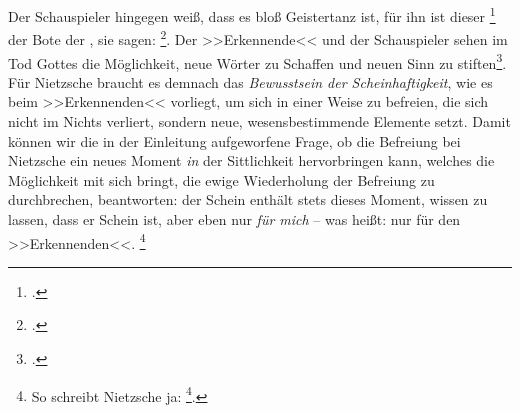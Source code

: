 \documentclass[12pt, a4paper, openany]{report}
\begin{document}
Der Schauspieler hingegen weiß, dass es bloß Geistertanz ist, für ihn ist dieser \footcite[][481]{nietzsche_morgenrote_1999} der Bote der , sie sagen: \footcite[][574]{nietzsche_morgenrote_1999}.
Der >>Erkennende<< und der Schauspieler sehen im Tod Gottes die Möglichkeit, neue Wörter zu Schaffen und neuen Sinn zu stiften\footcite[Vgl.][70]{stephan_nietzscheanismus_2019}. 
Für Nietzsche braucht es demnach das \emph{Bewusstsein der Scheinhaftigkeit}, wie es beim >>Erkennenden<< vorliegt, um sich in einer Weise zu befreien, die sich nicht im Nichts verliert, sondern neue, wesensbestimmende Elemente setzt.
Damit können wir die in der Einleitung aufgeworfene Frage, ob die Befreiung bei Nietzsche ein neues Moment \emph{in} der Sittlichkeit hervorbringen kann, welches die Möglichkeit mit sich bringt, die ewige Wiederholung der Befreiung zu durchbrechen, beantworten: 
der Schein enthält stets dieses Moment, wissen zu lassen, dass er Schein ist, aber eben nur \emph{für mich} -- was heißt: nur für den >>Erkennenden<<.%
\footnote{
    So schreibt Nietzsche ja: \footcite[][S. 417, Hervorhebung von mir]{nietzsche_morgenrote_1999}.
}
\end{document}
